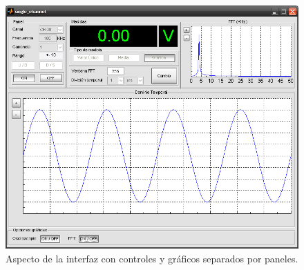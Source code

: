 \documentclass[a4paper,12pt]				{article}
\begin{document}
\begin{figure}
	\begin{center}
		\includegraphics{gis-pfc-appa-01.png}
	\end{center}
	\caption[Aspecto de la interfaz de usuario]{Aspecto de la interfaz
	con controles y gráficos separados por paneles.}
	\label{fig:interface}
\end{figure}
\end{document}
